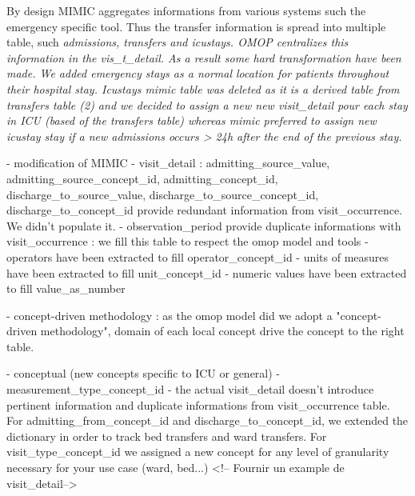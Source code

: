 By design MIMIC aggregates informations from various systems such the emergency
specific tool. Thus the transfer information is spread into multiple table,
such \it{admissions}, \it{transfers} and \it{icustays}. OMOP centralizes this
information in the \it{vis_t\_detail}. As a result some hard transformation
have been made. We added emergency stays as a normal location for patients
throughout their hospital stay. Icustays mimic table was deleted as it is a
derived table from transfers table (2) and we decided to assign a new new
\it{visit\_detail} pour each stay in ICU (based of the transfers table) whereas
mimic preferred to assign new icustay stay if a new admissions occurs > 24h
after the end of the previous stay.


- modification of MIMIC
	- visit\_detail : admitting\_source\_value, admitting\_source\_concept\_id, admitting\_concept\_id, discharge\_to\_source\_value, discharge\_to\_source\_concept\_id, discharge\_to\_concept\_id provide redundant information from visit\_occurrence. We didn't populate it.
	- observation\_period provide duplicate informations with visit\_occurrence : we fill this table to respect the omop model and tools
	- operators have been extracted to fill operator\_concept\_id
	- units of measures have been extracted to fill unit\_concept\_id
	- numeric values have been extracted to fill value\_as\_number


- concept-driven methodology : as the omop model did we adopt a "concept-driven
  methodology", domain of each local concept drive the concept to the right
  table.

	- conceptual (new concepts specific to ICU or general)
		- measurement\_type\_concept\_id
		- the actual visit\_detail doesn't introduce pertinent information and duplicate informations from visit\_occurrence table. For admitting\_from\_concept\_id and discharge\_to\_concept\_id, we extended the dictionary in order to track bed transfers and ward transfers. For visit\_type\_concept\_id we assigned a new concept for any level of granularity necessary for your use case (ward, bed...) 
		<!-- Fournir un example de visit\_detail-->


